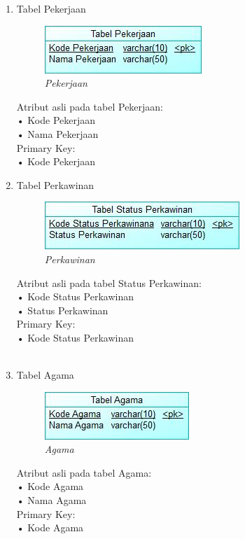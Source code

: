 \documentclass[12pt,a4paper,bahasa]{article}
\begin{document}
\begin{enumerate}
\item Tabel Pekerjaan\\
\begin{figure}[!htbp]
\centering
\includegraphics[scale=1.0]{gambar/Pekerjaan.jpeg}
\caption{\textit{Pekerjaan}}
\label{Pekerjaan}
\end{figure}
Atribut asli pada tabel Pekerjaan:\\
•	Kode Pekerjaan\\
•	Nama Pekerjaan\\
Primary Key:\\
•	Kode Pekerjaan

\item Tabel Perkawinan\\
\begin{figure}[!htbp]
\centering
\includegraphics[scale=1.0]{gambar/Perkawinan.jpeg}
\caption{\textit{Perkawinan}}
\label{Perkawinan}
\end{figure}
Atribut asli pada tabel Status Perkawinan:\\ 
•	Kode Status Perkawinan\\
•	Status Perkawinan\\
Primary Key:\\
•	Kode Status Perkawinan
\\
\\
\item Tabel Agama\\
\begin{figure}[!htbp]
\centering
\includegraphics[scale=1.0]{gambar/Agama.jpeg}
\caption{\textit{Agama}}
\label{Agama}
\end{figure}
Atribut asli pada tabel Agama:\\
•	Kode Agama\\
•	Nama Agama\\ 
Primary Key:\\
•	Kode Agama


\end{enumerate}
\end{document}
